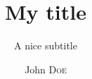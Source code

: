 \documentclass{styles/mastersthesis}  %
\title{My title} %
\subtitle{A nice subtitle}                     %
\author{John \textsc{Doe}}                     %
\begin{document}
  \maketitle
  \backcoverpage
\end{document}

